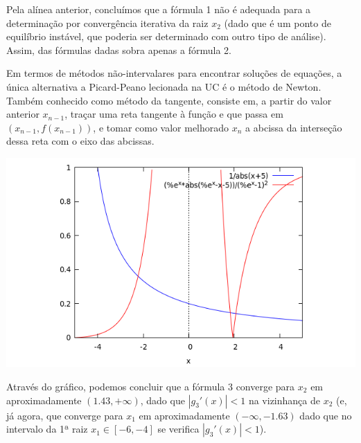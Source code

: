 \documentclass{mnum}
\begin{document}
Pela alínea anterior, concluímos que a fórmula 1 não é adequada para a determinação por convergência iterativa da raiz $x_2$ (dado que é um ponto de equilíbrio instável, que poderia ser determinado com outro tipo de análise). Assim, das fórmulas dadas sobra apenas a fórmula 2.\par
Em termos de métodos não-intervalares para encontrar soluções de equações, a única alternativa a Picard-Peano lecionada na UC é o método de Newton. Também conhecido como método da tangente, consiste em, a partir do valor anterior $x_{n-1}$, traçar uma reta tangente à função e que passa em $(x_{n-1}, f(x_{n-1}))$, e tomar como valor melhorado $x_n$ a abcissa da interseção dessa reta com o eixo das abcissas.

\begin{center} \includegraphics[scale=0.5]{2017E_3_3} \end{center}
Através do gráfico, podemos concluir que a fórmula 3 converge para $x_2$ em aproximadamente $(1.43, +\infty)$, dado que $|g_3'(x)|<1$ na vizinhança de $x_2$ (e, já agora, que converge para $x_1$ em aproximadamente $(-\infty, -1.63)$ dado que no intervalo da 1ª raiz $x_1 \in [-6,-4]$ se verifica $|g_3'(x)|<1$).
\end{document}
